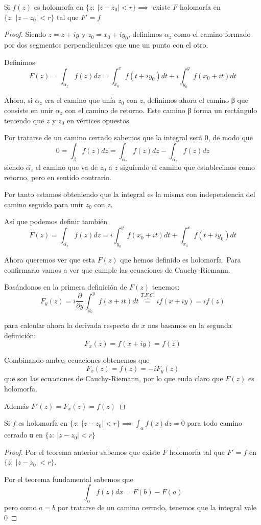 \documentclass{apuntes}
\begin{document}
\begin{theorem}
Si $f(z)$ es holomorfa en $\{z: \ |z-z_0|<r\} \implies$ existe $F$ holomorfa en $\{z: \ |z-z_0|<r\}$ tal que $F'=f$
\end{theorem}
\begin{proof}
Siendo $z=z+iy$ y $z_0=x_0+iy_0$, definimos $α_z$ como el camino formado por dos segmentos perpendiculares que une un punto con el otro.

Definimos
\[F(z)=\int_{α_z}f(z)dz =\int_{x_0}^xf(t+iy_0)dt+i \int_{y_0}^yf(x_0+it)dt\]

Ahora, si $α_z$ era el camino que unía $z_0$ con $z$, definimos ahora el camino β que consiste en unir $α_z$ con el camino de retorno. Este camino β forma un rectángulo teniendo que $z$ y $z_0$ en vértices opuestos.

Por tratarse de un camino cerrado sabemos que la integral será 0, de modo que
\[0 = \int_βf(z)dz = \int_{α_z}f(z)dz-\int_{\bar{α_z}}f(z)dz\]
siendo $\bar{α_z}$ el camino que va de $z_0$ a $z$ siguiendo el camino que establecimos como retorno, pero en sentido contrario.

Por tanto estamos obteniendo que la integral es la misma con independencia del camino seguido para unir $z_0$ con $z$.

Así que podemos definir también
\[F(z)=\int_{\bar{α_z}}f(z)dz =i\int_{y_0}^yf(x_0+it)dt + \int_{x_0}^xf(t+iy_0)dt\]

Ahora queremos ver que esta $F(z)$ que hemos definido es holomorfa. Para confirmarlo vamos a ver que cumple las ecuaciones de Cauchy-Riemann.

Basándonos en la primera definición de $F(z)$ tenemos:
\[F_y(z) = i \frac{\partial}{\partial y} \int_{y_0}^yf(x+it)dt \overbrace{=}^{T.F.C.} i f(x+iy)=if(z)\]

para calcular ahora la derivada respecto de $x$ nos basamos en la segunda definición:
\[F_x(z)=f(x+iy)=f(z)\]

Combinando ambas ecuaciones obtenemos que
\[F_x(z)=f(z)=-iF_y(z)\]
que son las ecuaciones de Cauchy-Riemann, por lo que euda claro que $F(z)$ es holomorfa.

Además $F'(z)=F_x(z)=f(z)$
\end{proof}

\begin{theorem}
Si $f$ es holomorfa en $\{z: \ |z-z_0|<r\} \implies \int_α f(z)dz = 0$ para todo camino cerrado α en $\{z: \ |z-z_0|<r\}$
\end{theorem}
\begin{proof}
Por el teorema anterior sabemos que existe $F$ holomorfa tal que $F'=f$ en $\{z: \ |z-z_0|<r\}$.

Por el teorema fundamental sabemos que
\[\int_α f(z)dx = F(b)-F(a)\]
pero como $a=b$ por tratarse de un camino cerrado, tenemos que la integral vale 0
\end{proof}
\end{document}
